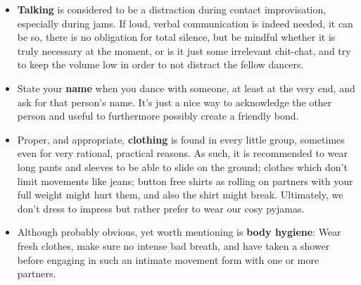 \begin{itemize}
    \item \textbf{Talking} is considered to be a distraction during contact improvisation, especially during jams.
    If loud, verbal communication is indeed needed, it can be so, there is no obligation for total silence, but be mindful whether it is truly necessary at the moment, or is it just some irrelevant chit-chat, and try to keep the volume low in order to not distract the fellow dancers.
    \item State your \textbf{name} when you dance with someone, at least at the very end, and ask for that person's name.
    It's just a nice way to acknowledge the other person and useful to furthermore possibly create a friendly bond.
    \item Proper, and appropriate, \textbf{clothing} is found in every little group, sometimes even for very rational, practical reasons.
    As such, it is recommended to wear long pants and sleeves to be able to slide on the ground; clothes which don't limit movements like jeans; button free shirts as rolling on partners with your full weight might hurt them, and also the shirt might break.
    Ultimately, we don't dress to impress but rather prefer to wear our cosy pyjamas.
    \item Although probably obvious, yet worth mentioning is \textbf{body hygiene}: Wear fresh clothes, make sure no intense bad breath, and have taken a shower before engaging in such an intimate movement form with one or more partners.
\end{itemize}
